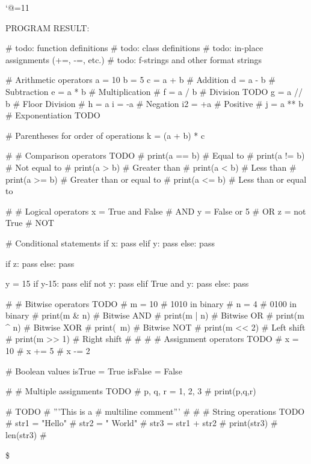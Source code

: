 \let\e\expandafter
\catcode`@=11

\def\@pytexError#1{%
	\errmessage{#1}%
}









\def\@pytexChar@Backslash{\loggingall\@pytexParser@parse}
\let\@pytexChar@Dollar\bye

\def\@pytexChar@DoubleQuote{\relax}
\def\@pytexChar@SingleQuote{\relax}


%

PROGRAM RESULT:

\@pytexCatcodes@setallactive

# todo: function definitions
# todo: class definitions
# todo: in-place assignments (+=, -=, etc.)
# todo: f-strings and other format strings


# Arithmetic operators
a = 10
b = 5
c = a + b  # Addition
d = a - b  # Subtraction
e = a * b  # Multiplication
# f = a / b  # Division TODO
g = a // b # Floor Division
# h = a %
i = -a     # Negation
i2 = +a    # Positive
# j = a ** b # Exponentiation TODO


# Parentheses for order of operations
k = (a + b) * c

# # Comparison operators TODO
# print(a == b)  # Equal to
# print(a != b)  # Not equal to
# print(a > b)   # Greater than
# print(a < b)   # Less than
# print(a >= b)  # Greater than or equal to
# print(a <= b)  # Less than or equal to


# # Logical operators
x = True and False  # AND
y = False or 5   # OR
z = not True        # NOT


# Conditional statements
if x:
    pass
elif y:
    pass
else:
    pass


if z:
    pass
else:
    pass

y = 15
if y-15:
    pass
elif not y:
	pass
elif True and y:
    pass
else:
    pass


# # Bitwise operators TODO
# m = 10  # 1010 in binary
# n = 4   # 0100 in binary
# print(m & n)  # Bitwise AND
# print(m | n)  # Bitwise OR
# print(m ^ n)  # Bitwise XOR
# print(~m)   # Bitwise NOT
# print(m << 2) # Left shift
# print(m >> 1) # Right shift
# 
# 
# # Assignment operators TODO
# x = 10
# x += 5
# x -= 2

# Boolean values
isTrue = True
isFalse = False

# # Multiple assignments TODO
# p, q, r = 1, 2, 3
# print(p,q,r)

# TODO
# '''This is a
# multiline comment'''
# 
# 
# String operations TODO
# str1 = "Hello"
# str2 = " World"
# str3 = str1 + str2
# print(str3)
# len(str3)
# 

\$
\bye
